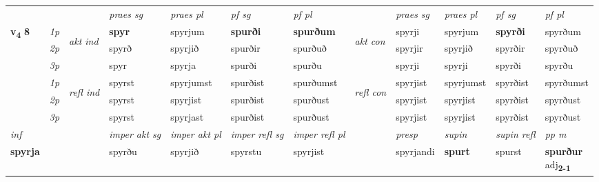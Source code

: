 \begin{longtable}[l]{X>{\footnotesize\itshape}llXXXXlXXXX}
 & &   & \textit{praes sg}  & \textit{praes pl}    & \textit{ pf sg} & \textit{pf pl} & & \textit{praes sg}  & \textit{praes pl}    & \textit{pf sg} & \textit{pf pl }  \\ \cmidrule{4-7} \cmidrule{9-12}
 \multirow{2}{*}{{{\textbf{v{\textsubscript{4}}} \Large{\textbf{8}}}}}  & 1p & \multirow{3}{*}{\begin{turn}{90}\textit{akt ind}\end{turn}} & \textbf{spyr} & spyrjum & \textbf{spurði} & \textbf{spurðum} & \multirow{3}{*}{\begin{turn}{90}\textit{akt con}\end{turn}} &spyrji & spyrjum & \textbf{spyrði} & spyrðum\\*
 & 2p &  &  spyrð  & spyrjið & spurðir & spurðuð & & spyrjir & spyrjið & spyrðir & spyrðuð \\*
 & 3p &  & spyr & spyrja & spurði & spurðu & & spyrji & spyrji& spyrði & spyrðu \\*
\cmidrule{4-7} \cmidrule{9-12}
 & 1p & \multirow{3}{*}{\begin{turn}{90}\textit{refl ind}\end{turn}}  & spyrst & spyrjumst & spurðist & spurðumst & \multirow{3}{*}{\begin{turn}{90}\textit{refl con}\end{turn}}  &spyrjist & spyrjumst & spyrðist & spyrðumst \\*
 & 2p &  & spyrst & spyrjist & spurðist & spurðust & &spyrjist & spyrjist & spyrðist & spyrðust \\*
 & 3p  & & spyrst & spyrjast & spurðist & spurðust & & spyrjist & spyrjist& spyrðist & spyrðust \\*
\cmidrule{4-7} \cmidrule{9-12}

   {\textit{inf}} & &  & \textit{imper akt sg} & \textit{imper akt pl} & \textit{imper refl sg} & \textit{imper refl pl} && \textit{presp} & \textit{supin} & \textit{supin refl} & \textit{pp m} \\*
  {\textbf{spyrja}} & && spyrðu  & spyrjið & spyrstu & spyrjist && spyrjandi &  \textbf{spurt} & spurst & \specialcell{\textbf{spurður} \\ adj\textbf{\textsubscript{2-1}}} \\*

\midrule


\end{longtable}

